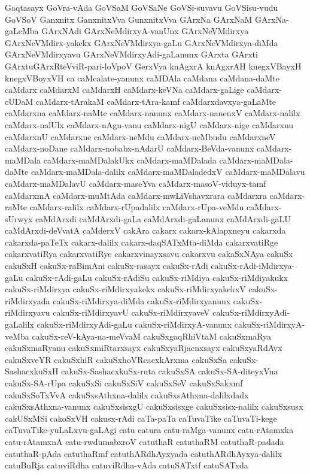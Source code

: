 {Gaqtasayx
GoVra-vAda
GoVSaM
GoVSaNe
GoVSi-suvavu
GoVSisu-vudu
GoVSoV
Ganxnitx
GanxnitxVva
GunxnitxVva
GArxNa
GArxNaM
GArxNa-gaLeMba
GArxNAdi
GArxNeMdirxyA-vanUnx
GArxNeVMdirxya
GArxNeVMdirx-yakekx
GArxNeVMdirxya-gaLu
GArxNeVMdirxya-diMda
GArxNeVMdirxyavu
GArxNeVMdirxyAdi-gaLanunx
GArxta
GArxti
GArxtuGArxRteVviR-pari-loVpoV
GerxVya
knAgxrA
knAgxrAH
knegxVBayxH
knegxVBoyxVH
ca
caMcalate-yanunx
caMDAla
caMdana
caMdana-daMte
caMdarx
caMdarxM
caMdarxH
caMdarx-keVNa
caMdarx-gaLige
caMdarx-cUDaM
caMdarx-tArakaM
caMdarx-tAra-kamf
caMdarxdavxya-gaLaMte
caMdarxna
caMdarx-naMte
caMdarx-nanunx
caMdarx-nanenxV
caMdarx-nalilx
caMdarx-nalUlx
caMdarx-nAgu-vanu
caMdarx-nigU
caMdarx-nige
caMdarxnu
caMdarxnU
caMdarxne
caMdarx-neMdu
caMdarx-neMbudu
caMdarxneV
caMdarx-noDane
caMdarx-nobabx-nAdarU
caMdarx-BeVda-vanunx
caMdarx-maMDala
caMdarx-maMDalakUkx
caMdarx-maMDalada
caMdarx-maMDala-daMte
caMdarx-maMDala-dalilx
caMdarx-maMDaladedxV
caMdarx-maMDalavu
caMdarx-maMDalavU
caMdarx-maseYva
caMdarx-masoV-viduyx-tamf
caMdarxmA
caMdarx-muMtAda
caMdarx-mwLiVshavxrara
caMdarxra
caMdarx-raMte
caMdarx-ralilx
caMdarx-rUpadalilx
caMdarx-rUpa-veMdu
caMdarx-sUrwyx
caMdArxdi
caMdArxdi-gaLa
caMdArxdi-gaLanunx
caMdArxdi-gaLU
caMdArxdi-deVvatA
caMderxV
cakAra
cakarx
cakarx-kAlapxneyu
cakarxda
cakarxda-paTeTx
cakarx-dalilx
cakarx-daqSATxMta-diMda
cakarxvatiRge
cakarxvatiRya
cakarxvatiRye
cakarxvinayxsavu
cakarxvu
cakaSxNAya
cakuSx
cakuSxH
cakuSx-raBimAni
cakuSx-rasayx
cakuSx-rAdi
cakuSx-rAdi-iMdirxya-gaLu
cakuSx-rAdi-gaLu
cakuSx-rAdiSu
cakuSx-riMdiya
cakuSx-riMdiyakukx
cakuSx-riMdirxya
cakuSx-riMdirxyakekx
cakuSx-riMdirxyakekxV
cakuSx-riMdirxyada
cakuSx-riMdirxya-diMda
cakuSx-riMdirxyanunx
cakuSx-riMdirxyavu
cakuSx-riMdirxyavU
cakuSx-riMdirxyaveV
cakuSx-riMdirxyAdi-gaLalilx
cakuSx-riMdirxyAdi-gaLu
cakuSx-riMdirxyA-vanunx
cakuSx-riMdirxyA-veMba
cakuSx-reV-kAya-na-meVvaM
cakuSxgaqRhiVtaM
cakuSxmaRya
cakuSxmaRyanu
cakuSxmiRtarxsayx
cakuSxyaRjacnxsayx
cakuSxyaRdAvx
cakuSxveYR
cakuSxhiR
cakuSxhoVRcacxkArxma
cakuSxSa
cakuSx-SashacxkuSxH
cakuSx-SashacxkuSx-ruta
cakuSxSA
cakuSx-SA-diteyxVna
cakuSx-SA-rUpa
cakuSxSi
cakuSxSiV
cakuSxSeV
cakuSxSakxmf
cakuSxSoTxVvA
cakuSxsAthxna-dalilx
cakuSxsAthxna-dalilxdadx
cakuSxsAthxna-vanunx
cakuSxsisxgU
cakuSxsisxge
cakuSxsisx-nalilx
cakuSxsusx
cakUSxMSi
cakoSxVH
cakusx-rAdi
caTa-paTa
caTuvaTike
caTuvaTi-kege
caTuvaTike-yuLaLxvu-gaLAgi
catu
catura
catu-raMga-vanunx
catu-rAtamxka
catu-rAtamxnA
catu-rwdumabxroV
catuthaR
catuthaRM
catuthaR-padada
catuthaR-pAda
catuthaRmf
catuthARdhAyxyada
catuthARdhAyxya-dalilx
catuBuRja
catuviRdha
catuviRdha-vAda
catuSATxtf
catuSATxda
}

